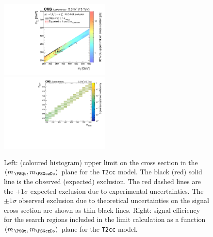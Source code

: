 \clearpage
\begin{figure}[t]
  \begin{center}
    \includegraphics[width=0.49\textwidth]{RA1T2ccXSEC_aux} \, 
    \includegraphics[width=0.49\textwidth]{T2cc_merging_4_cats_aux} \,     
  \end{center}
  \caption{Left: (coloured histogram) upper limit on the cross section in the $(m_{\,\PSQt}, m_{\PSGczDo})$ plane for the \texttt{T2cc} model. 
  The black (red) solid line is the observed (expected) exclusion. The red dashed lines are the $\pm1\sigma$ expected exclusion due to experimental uncertainties. 
  The $\pm1\sigma$ observed exclusion due to theoretical uncertainties on the signal cross section are shown as thin black lines. 
  Right: signal efficiency for the search regions included in the limit calculation as a function $(m_{\,\PSQt}, m_{\PSGczDo})$ plane for the \texttt{T2cc} model. 
  \label{fig:T2cc_excl}}
\end{figure}

